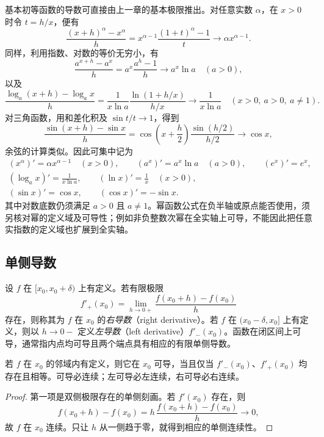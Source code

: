 基本初等函数的导数可直接由上一章的基本极限推出。对任意实数 $\alpha$，在 $x>0$ 时令 $t=h/x$，便有
\[
    \frac{(x+h)^\alpha-x^\alpha}h
    =x^{\alpha-1}\frac{(1+t)^\alpha-1}t
    \longrightarrow\alpha x^{\alpha-1}.
\]
同样，利用指数、对数的等价无穷小，有
\[
    \frac{a^{x+h}-a^x}h=a^x\frac{a^h-1}h
    \longrightarrow a^x\ln a\quad(a>0),
\]
以及
\[
    \frac{\log_a(x+h)-\log_a x}h
    =\frac1{x\ln a}\frac{\ln(1+h/x)}{h/x}
    \longrightarrow\frac1{x\ln a}
    \quad(x>0,\ a>0,\ a\ne1).
\]
对三角函数，用和差化积及 $\sin t/t\to1$，得到
\[
    \frac{\sin(x+h)-\sin x}h
    =\cos\left(x+\frac h2\right)\frac{\sin(h/2)}{h/2}
    \longrightarrow\cos x,
\]
余弦的计算类似。因此可集中记为
\begin{equation}
\label{eq:basic-power-exponential-trigonometric-derivatives}
\begin{gathered}
    (x^\alpha)'=\alpha x^{\alpha-1}\quad(x>0),\qquad
    (a^x)'=a^x\ln a\quad(a>0),\qquad (e^x)'=e^x,\\
    (\log_a x)'=\frac1{x\ln a},\qquad (\ln x)'=\frac1x\quad(x>0),\\
    (\sin x)'=\cos x,\qquad (\cos x)'=-\sin x.
\end{gathered}
\end{equation}
其中对数底数仍须满足 $a>0$ 且 $a\ne1$。幂函数公式在负半轴或原点能否使用，须另核对幂的定义域及可导性；例如非负整数次幂在全实轴上可导，不能因此把任意实指数的定义域也扩展到全实轴。

\subsection{单侧导数}
\label{subsec:one-sided-derivatives}

\begin{definition}
\label{def:one-sided-derivatives}
设 $f$ 在 $[x_0,x_0+\delta)$ 上有定义。若有限极限
\[
    f'_+(x_0)=\lim_{h\to0+}\frac{f(x_0+h)-f(x_0)}h
\]
存在，则称其为 $f$ 在 $x_0$ 的\emph{右导数}（right derivative）。若 $f$ 在 $(x_0-\delta,x_0]$ 上有定义，则以 $h\to0-$ 定义\emph{左导数}（left derivative）$f'_-(x_0)$。函数在闭区间上可导，通常指内点均可导且两个端点具有相应的有限单侧导数。
\end{definition}

\begin{proposition}
\label{prop:derivative-one-sided-and-continuity}
若 $f$ 在 $x_0$ 的邻域内有定义，则它在 $x_0$ 可导，当且仅当 $f'_-(x_0)$、$f'_+(x_0)$ 均存在且相等。可导必连续；左可导必左连续，右可导必右连续。
\end{proposition}
\begin{proof}
第一项是双侧极限存在的单侧刻画。若 $f'(x_0)$ 存在，则
\[
    f(x_0+h)-f(x_0)
    =h\,\frac{f(x_0+h)-f(x_0)}h\longrightarrow0,
\]
故 $f$ 在 $x_0$ 连续。只让 $h$ 从一侧趋于零，就得到相应的单侧连续性。
\end{proof}

